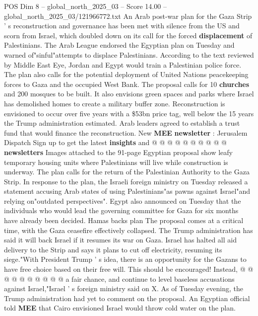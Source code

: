 \begin{textsample}{POS Dim 8 – global\_north\_2025\_03 – Score 14.00 – global\_north\_2025\_03/121966772.txt}  \label{ex:f8_pos_082}
An Arab post-war plan for the Gaza Strip ' s reconstruction and governance has been met with silence from the US and scorn from Israel, which doubled down on its call for the forced \textbf{displacement} of Palestinians.
The Arab League endorsed the Egyptian plan on Tuesday and warned of"sinful"attempts to displace Palestinians.
According to the text reviewed by Middle East Eye, Jordan and Egypt would train a Palestinian police force.
The plan also calls for the potential deployment of United Nations peacekeeping forces to Gaza and the occupied West Bank.
The proposal calls for 10 \textbf{churches} and 200 mosques to be built.
It also envisions green spaces and parks where Israel has demolished homes to create a military buffer zone.
Reconstruction is envisioned to occur over five years with a \$53bn price tag, well below the 15 years the Trump administration estimated.
Arab leaders agreed to establish a trust fund that would finance the reconstruction.
New \textbf{MEE} \textbf{newsletter} : Jerusalem Dispatch Sign up to get the latest \textbf{insights} and @ @ @ @ @ @ @ @ @ @ \textbf{newsletters} Images attached to the 91-page Egyptian proposal show leafy temporary housing units where Palestinians will live while construction is underway.
The plan calls for the return of the Palestinian Authority to the Gaza Strip.
In response to the plan, the Israeli foreign ministry on Tuesday released a statement accusing Arab states of using Palestinians"as pawns against Israel"and relying on"outdated perspectives".
Egypt also announced on Tuesday that the individuals who would lead the governing committee for Gaza for six months have already been decided.
Hamas backs plan The proposal comes at a critical time, with the Gaza ceasefire effectively collapsed.
The Trump administration has said it will back Israel if it resumes its war on Gaza.
Israel has halted all aid delivery to the Strip and says it plans to cut off electricity, resuming its siege."With President Trump ' s idea, there is an opportunity for the Gazans to have free choice based on their free will.
This should be encouraged!
Instead, @ @ @ @ @ @ @ @ @ @ a fair chance, and continue to level baseless accusations against Israel,"Israel ' s foreign ministry said on X.
As of Tuesday evening, the Trump administration had yet to comment on the proposal.
An Egyptian official told \textbf{MEE} that Cairo envisioned Israel would throw cold water on the plan.

\end{textsample}

